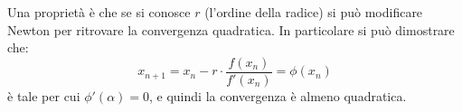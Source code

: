 \documentclass[a4paper,11pt]{article}
\begin{document}
Una proprietà è che se si conosce $r$ (l'ordine della radice) si può modificare Newton per ritrovare la convergenza quadratica.
In particolare si può dimostrare che:
$$
x_{n + 1} = x_n - r \cdot \frac{f(x_n)}{f'(x_n)} = \phi(x_n)
$$
è tale per cui $\phi'(\alpha) = 0$, e quindi la convergenza è almeno quadratica.
\end{document}
